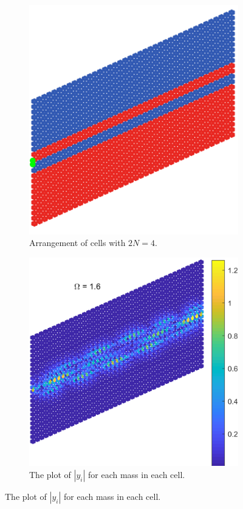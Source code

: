 \begin{figure}
\medskip
\begin{subfigure}[b]{.5\textwidth}
  \centering
  \includegraphics[width=0.7\linewidth]{imgs/svbthinarr.png}
  \caption{Arrangement of cells with $2N=4$.}
  \label{fig:sub1}
\end{subfigure}%
\begin{subfigure}[b]{.5\textwidth}
  \centering
  \includegraphics[width=0.9\linewidth]{imgs/svbthinscat.png}
  \caption{The plot of $|y_i|$ for each mass in each cell.}
  \label{fig:sub2}
\end{subfigure}


\end{figure}
